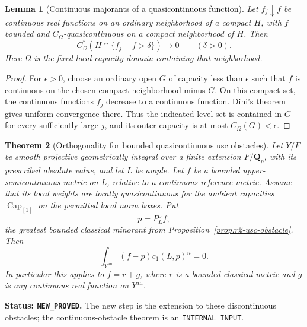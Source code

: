 \documentclass[11pt,a4paper]{article}
\numberwithin{equation}{section}
\newtheorem{theorem}{Theorem}[section]
\newtheorem{lemma}[theorem]{Lemma}
\theoremstyle{definition}
\theoremstyle{remark}
\newcommand{\an}{\mathrm{an}}
\begin{document}
\begin{lemma}[Continuous majorants of a quasicontinuous function]
\label{lem:r2-continuous-majorants-capacity}
Let $f_j\downarrow f$ be continuous real functions on an ordinary
neighborhood of a compact $H$, with $f$ bounded and
$C_\Omega$-quasicontinuous on a compact neighborhood of $H$.
Then
\[
 C_\Omega^*(H\cap\{f_j-f>\delta\})\longrightarrow0
       \qquad(\delta>0).
\]
Here $\Omega$ is the fixed local capacity domain containing that
neighborhood.
\end{lemma}

\begin{proof}
For $\epsilon>0$, choose an ordinary open $G$ of capacity less
than $\epsilon$ such that $f$ is continuous on the chosen compact
neighborhood minus $G$. On this compact set, the continuous
functions $f_j$ decrease to a continuous function. Dini's theorem
gives uniform convergence there. Thus the indicated level set is
contained in $G$ for every sufficiently large $j$, and its outer
capacity is at most $C_\Omega(G)<\epsilon$.
\end{proof}

\begin{theorem}[Orthogonality for bounded quasicontinuous usc obstacles]
\label{thm:r2-qc-orthogonality}
Let $Y/F$ be smooth projective geometrically integral over a finite
extension $F/\mathbf Q_p$, with its prescribed absolute value,
and let $L$ be ample. Let $f$ be a bounded
upper-semicontinuous metric on $L$, relative to a continuous
reference metric. Assume that its local weights are locally
quasicontinuous for the ambient capacities $\operatorname{Cap}_{[1]}$
on the permitted local norm boxes. Put
\[
 p=P_L^{\mathrm b} f,
\]
the greatest bounded classical minorant from
Proposition~\ref{prop:r2-usc-obstacle}. Then
\begin{equation}
\label{eq:r2-qc-orthogonality}
 \int_{Y^{\an}}(f-p)c_1(L,p)^n=0.
\end{equation}
In particular this applies to $f=r+g$, where $r$ is a bounded
classical metric and $g$ is any continuous real function on
$Y^{\an}$.
\end{theorem}

\noindent\textbf{Status: \texttt{NEW\_PROVED}.}
The new step is the extension to these discontinuous obstacles;
the continuous-obstacle theorem is an \texttt{INTERNAL\_INPUT}.
\end{document}

